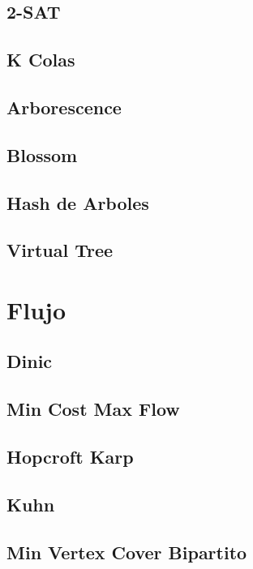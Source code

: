 \documentclass[a4paper,10pt,landscape,twocolumn]{article}
\begin{document}
\subsection{2-SAT}

\subsection{K Colas}

\subsection{Arborescence}

\subsection{Blossom}

\subsection{Hash de Arboles}

\subsection{Virtual Tree}


\section{Flujo} %
\subsection{Dinic}

\subsection{Min Cost Max Flow}

\subsection{Hopcroft Karp}

\subsection{Kuhn}

\subsection{Min Vertex Cover Bipartito}

\end{document}
